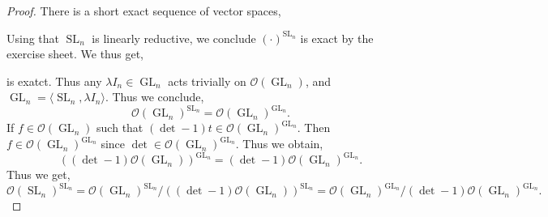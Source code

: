 \documentclass[10pt]{article}
\numberwithin{equation}{theorem}
\DeclareMathOperator{\GL}{GL}
\DeclareMathOperator{\SL}{SL}
\newcommand{\Ouv}[0]{\mathcal{O}}
\begin{document}
\begin{proof}
  There is a short exact sequence of vector spaces,
  \begin{center}
  \end{center}
  Using that $\SL_n$ is linearly reductive, we conclude $(\cdot)^{\SL_n}$ is exact by the exercise sheet. We thus get,
  \begin{center}
  \end{center}
  is exatct. Thus any $\lambda I_n\in\GL_n$ acts trivially on $\Ouv(\GL_n)$, and $\GL_n = \langle\SL_n,\lambda I_n\rangle$. Thus we conclude,
  \begin{equation*}
    \Ouv(\GL_n)^{\SL_n} = \Ouv(\GL_n)^{\GL_n}.
  \end{equation*}
  If $f\in \Ouv(\GL_n)$ such that $(\det-1)t\in\Ouv(\GL_n)^{\GL_n}$. Then $f\in\Ouv(\GL_n)^{\GL_n}$ since $\det\in\Ouv(\GL_n)^{\GL_n}$. Thus we obtain,
  \begin{equation*}
    ((\det-1)\Ouv(\GL_n))^{\GL_n} = (\det - 1)\Ouv(\GL_n)^{\GL_n}.
  \end{equation*}
  Thus we get,
  \begin{equation*}
    \Ouv(\SL_n)^{\SL_n}=\Ouv(\GL_n)^{\SL_n}/((\det-1)\Ouv(\GL_n))^{\SL_n} = \Ouv(\GL_n)^{\GL_n}/(\det-1)\Ouv(\GL_n)^{\GL_n}.
  \end{equation*}
\end{proof}
\end{document}
